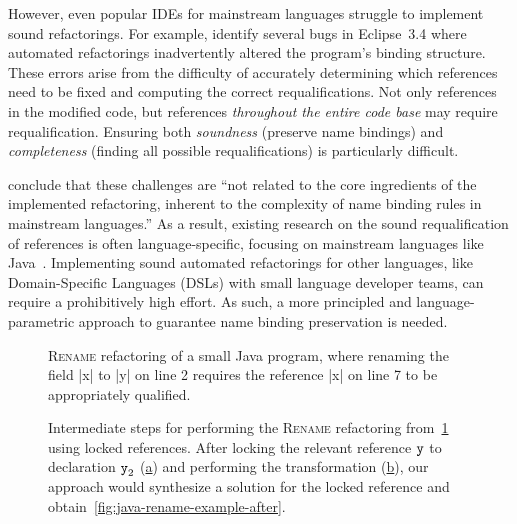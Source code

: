 However, even popular IDEs for mainstream languages struggle to implement sound refactorings.
For example, \citet{EkmanSV08} identify several bugs in Eclipse~3.4 where automated refactorings inadvertently altered the program's binding structure.
These errors arise from the difficulty of accurately determining which references need to be fixed and computing the correct requalifications.
Not only references in the modified code, but references \emph{throughout the entire code base} may require requalification.
Ensuring both \emph{soundness} (preserve name bindings) and \emph{completeness} (finding all possible requalifications) is particularly difficult.

 conclude that these challenges are ``not related to the core ingredients of the implemented refactoring,  inherent to the complexity of name binding rules in mainstream languages.''
As a result, existing research on the sound requalification of references is often language-specific, focusing on mainstream languages like Java~\cite{SchaferTST12}.
Implementing sound automated refactorings for other languages, like Domain-Specific Languages (DSLs) with small language developer teams, can require a prohibitively high effort.
As such, a more principled and language-parametric approach to guarantee name binding preservation is needed.

\begin{figure}[t]
  
  \caption{
    \textsc{Rename} refactoring of a small Java program, where renaming the field \Java|x| to \Java|y| on line 2 requires the reference \Java|x| on line 7 to be appropriately qualified.
  }%
  \label{fig:java-rename-example}
\end{figure}

\begin{figure}[t]
  
  \caption{
    Intermediate steps for performing the \textsc{Rename} refactoring from~\cref{fig:java-rename-example} using locked references.
    After locking the relevant reference $\texttt{y}$ to declaration $\texttt{y}_{2}$ (\hyperref[fig:java-rename-example-intermediate-steps-before]{a}) and performing the transformation (\hyperref[fig:java-rename-example-intermediate-steps-after]{b}), our approach would synthesize a solution for the locked reference and obtain~\cref{fig:java-rename-example-after}.
  }%
  \label{fig:java-rename-example-intermediate-steps}
\end{figure}

